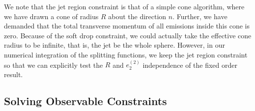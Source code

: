 \documentclass[a4paper,11pt]{article}
\newcommand{\ecf}[2]{e_{#1}^{(#2)}}
\begin{document}
We note that the jet region constraint is that of a simple cone algorithm, where we have drawn a cone of radius $R$ about the direction $n$. Further, we have demanded that the total transverse momentum of all emissions inside this cone is zero. Because of the soft drop constraint, we could actually take the effective cone radius to be infinite, that is, the jet be the whole sphere. However, in our numerical integration of the splitting functions, we keep the jet region constraint so that we can explicitly test the $R$ and $\ecf{2}{2}$ independence of the fixed order result. 

\subsection{Solving Observable Constraints}
\end{document}
